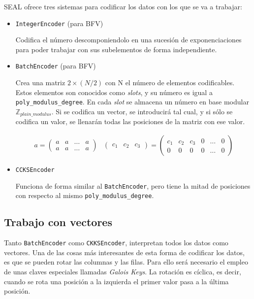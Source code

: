 SEAL ofrece tres sistemas para codificar los datos con los que se va a trabajar:
\begin{itemize}
    \item \verb|IntegerEncoder| (para BFV)

    Codifica el número descomponiendolo en una sucesión de exponenciaciones para poder trabajar con sus subelementos de forma independiente.

    \item \verb|BatchEncoder| (para BFV)

    Crea una matriz $2 \times (N/2)$ con N el número de elementos codificables. Estos elementos son conocidos como \textit{slots}, y su número es igual a \verb|poly_modulus_degree|. En cada \textit{slot} se almacena un número en base modular $\mathbb{Z}_{plain\_modulus}$. Si se codifica un vector, se introducirá tal cual, y si sólo se codifica un valor, se llenarán todas las posiciones de la matriz con ese valor.

    \begin{gather}
        a =
        \begin{pmatrix}
        a & a & \hdots & a \\
        a & a & \hdots & a
        \end{pmatrix} &
        \begin{pmatrix}
        c_1 & c_2 & c_3
        \end{pmatrix}
        =
        \begin{pmatrix}
        c_1 & c_2   & c_3   & 0     & \hdots & 0 \\
        0   & 0     & 0     & 0     & \hdots & 0
        \end{pmatrix}
    \end{gather}

    \item \verb|CCKSEncoder|

    Funciona de forma similar al \verb|BatchEncoder|, pero tiene la mitad de posiciones con respecto al mismo \verb|poly_modulus_degree|.
\end{itemize}{}

\subsection{Trabajo con vectores}

Tanto \verb|BatchEncoder| como \verb|CKKSEncoder|, interpretan todos los datos como vectores. Una de las cosas más interesantes de esta forma de codificar los datos, es que se pueden rotar las columnas y las filas. Para ello será necesario el empleo de unas claves especiales llamadas \textit{Galois Keys}. La rotación es cíclica, es decir, cuando se rota una posición a la izquierda el primer valor pasa a la última posición.

